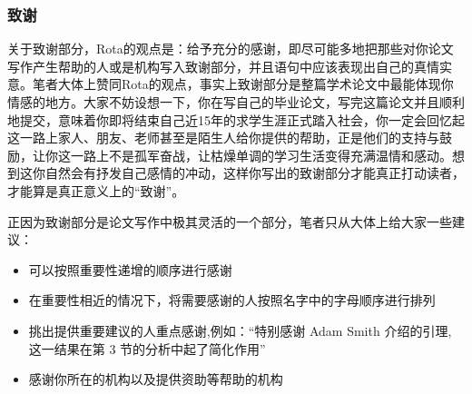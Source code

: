 \documentclass{formatBook}
\begin{document}
\subsubsection{致谢}
关于致谢部分，Rota的观点是：给予充分的感谢，即尽可能多地把那些对你论文写作产生帮助的人或是机构写入致谢部分，并且语句中应该表现出自己的真情实意。笔者大体上赞同Rota的观点，事实上致谢部分是整篇学术论文中最能体现你情感的地方。大家不妨设想一下，你在写自己的毕业论文，写完这篇论文并且顺利地提交，意味着你即将结束自己近15年的求学生涯正式踏入社会，你一定会回忆起这一路上家人、朋友、老师甚至是陌生人给你提供的帮助，正是他们的支持与鼓励，让你这一路上不是孤军奋战，让枯燥单调的学习生活变得充满温情和感动。想到这你自然会有抒发自己感情的冲动，这样你写出的致谢部分才能真正打动读者，才能算是真正意义上的“致谢”。\par
正因为致谢部分是论文写作中极其灵活的一个部分，笔者只从大体上给大家一些建议：
\begin{itemize}
    \item 可以按照重要性递增的顺序进行感谢
    \item 在重要性相近的情况下，将需要感谢的人按照名字中的字母顺序进行排列
    \item 挑出提供重要建议的人重点感谢,例如：“特别感谢 Adam Smith 介绍的引理, 这一结果在第 3 节的分析中起了简化作用”
    \item 感谢你所在的机构以及提供资助等帮助的机构
\end{itemize}
\end{document}
